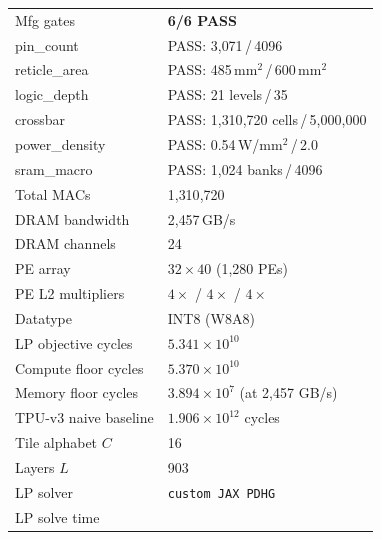 \begin{table}[h]
\begin{tabular}{@{}ll@{}}
\midrule
Mfg gates               & \textcolor{green!60!black}{\textbf{6/6 PASS}} \\
\quad pin\_count         & PASS: 3{,}071\,/\,4096 \\
\quad reticle\_area      & PASS: 485\,mm$^2$\,/\,600\,mm$^2$ \\
\quad logic\_depth       & PASS: 21 levels\,/\,35 \\
\quad crossbar           & PASS: 1{,}310{,}720 cells\,/\,5{,}000{,}000 \\
\quad power\_density     & PASS: 0.54\,W/mm$^2$\,/\,2.0 \\
\quad sram\_macro        & PASS: 1{,}024 banks\,/\,4096 \\
\midrule
Total MACs              & 1{,}310{,}720 \\
DRAM bandwidth          & 2{,}457\,GB/s \\
DRAM channels           & 24 \\
PE array                & $32 \times 40$ (1{,}280 PEs) \\
PE L2 multipliers       & $4\times$ / $4\times$ / $4\times$ \\
Datatype                & INT8 (W8A8) \\
LP objective cycles     & $5.341 \times 10^{10}$ \\
Compute floor cycles    & $5.370 \times 10^{10}$ \\
Memory floor cycles     & $3.894 \times 10^{7}$ (at 2{,}457 GB/s) \\
TPU-v3 naive baseline   & $1.906 \times 10^{12}$ cycles \\
Tile alphabet $C$       & 16 \\
Layers $L$              & 903 \\
LP solver               & \texttt{custom JAX PDHG} \\
LP solve time           &  \\
\bottomrule
\end{tabular}
\end{table}



\newpage